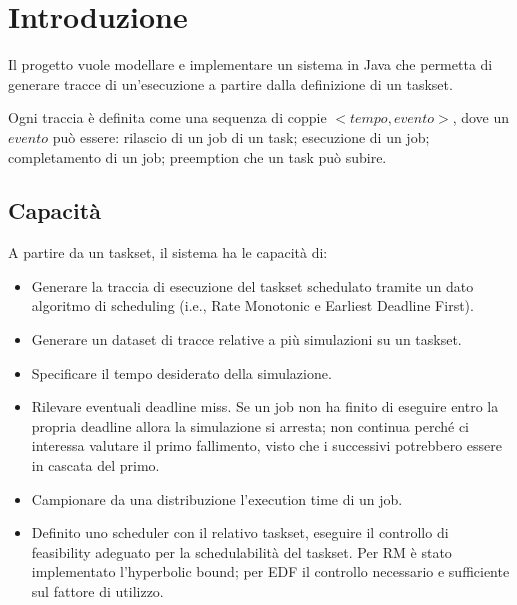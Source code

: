 \chapter{Introduzione}
Il progetto vuole modellare e implementare un sistema in Java che permetta di generare tracce di un'esecuzione a partire dalla definizione di un taskset.

Ogni traccia è definita come una sequenza di coppie $<tempo, evento>$, dove un $evento$ può essere: rilascio di un job di un task; esecuzione di un job; completamento di un job; preemption che un task può subire.

\section{Capacità}
A partire da un taskset, il sistema ha le capacità di:
\begin{itemize}
    \item Generare la traccia di esecuzione del taskset schedulato tramite un dato algoritmo di scheduling (i.e., Rate Monotonic e Earliest Deadline First).
    \item Generare un dataset di tracce relative a più simulazioni su un taskset.
    \item Specificare il tempo desiderato della simulazione.
    \item Rilevare eventuali deadline miss. Se un job non ha finito di eseguire entro la propria deadline allora la simulazione si arresta; non continua perché ci interessa valutare il primo fallimento, visto che i successivi potrebbero essere in cascata del primo.
    \item Campionare da una distribuzione l'execution time di un job.
    \item Definito uno scheduler con il relativo taskset, eseguire il controllo di feasibility adeguato per la schedulabilità del taskset. Per RM è stato implementato l'hyperbolic bound; per EDF il controllo necessario e sufficiente sul fattore di utilizzo.
\end{itemize}